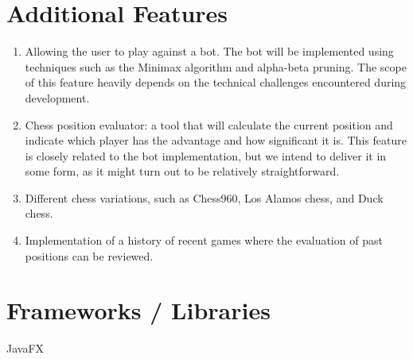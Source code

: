 \documentclass[12pt,a4paper]{article}
\begin{document}
\section{Additional Features}
\begin{enumerate}
    \item Allowing the user to play against a bot. The bot will be implemented using techniques such as the Minimax algorithm and alpha-beta pruning. The scope of this feature heavily depends on the technical challenges encountered during development.
    \item Chess position evaluator: a tool that will calculate the current position and indicate which player has the advantage and how significant it is. This feature is closely related to the bot implementation, but we intend to deliver it in some form, as it might turn out to be relatively straightforward.
    \item Different chess variations, such as Chess960, Los Alamos chess, and Duck chess.
    \item Implementation of a history of recent games where the evaluation of past positions can be reviewed.
\end{enumerate}

\section{Frameworks / Libraries}
JavaFX
\end{document}

